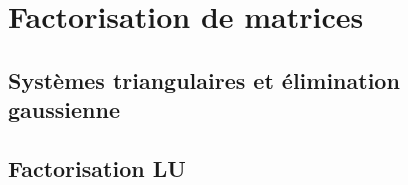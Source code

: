 








%
%
%
%
%
%
%
%



\clearpage
\section{Factorisation de matrices}

\subsection{Systèmes triangulaires et élimination gaussienne}

\subsection{Factorisation LU}

